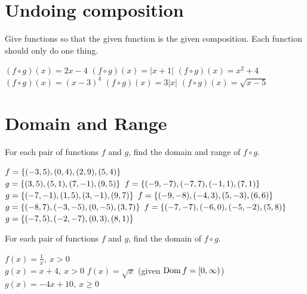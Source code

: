 \section*{Undoing composition}
Give functions so that the given function is the given composition. Each function should only do one thing.
\begin{smenum}
\mitemxxx
{$(f\circ g)(x)=2x-4$}
{$(f\circ g)(x)=|x+1|$}
{$(f\circ g)(x)=x^2+4$}
\mitemxxx
{$(f\circ g)(x)=(x-3)^4$}
{$(f\circ g)(x)=3|x|$}
{$(f\circ g)(x)=\sqrt{x-5}$}
\end{smenum}

\section*{Domain and Range}
For each pair of functions $f$ and $g$, find the domain and range of $f\circ g$.
\begin{smenum}
\mitemxx
{$f=\left\{(-3,5),(0,4),(2,9),(5,4)\right\}$\\$g=\left\{(3,5),(5,1),(7,-1),(9,5)\right\}$}
{$f=\left\{(-9,-7),(-7,7),(-1,1),(7,1)\right\}$\\$g=\left\{(-7,-1),(1,5),(3,-1),(9,7)\right\}$}
\mitemxx
{$f=\left\{(-9,-8),(-4,3),(5,-3),(6,6)\right\}$\\$g=\left\{(-8,7),(-3,-5),(0,-5),(3,7)\right\}$}
{$f=\left\{(-7,-7),(-6,0),(-5,-2),(5,8)\right\}$\\$g=\left\{(-7,5),(-2,-7),(0,3),(8,1)\right\}$}
\end{smenum}
For each pair of functions $f$ and $g$, find the domain of $f\circ g$.
\begin{smenum}
\mitemxx
{$f(x)=\frac{1}{x},\ x>0$\\$g(x)=x+4,\ x>0$}
{$f(x)=\sqrt x$ (given $\operatorname{Dom} f=\left[0,\infty\right)$)\\$g(x)=-4x+10,\ x\geq 0$}
\end{smenum}
